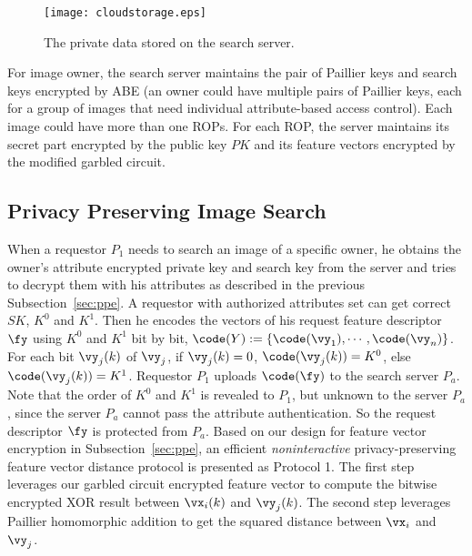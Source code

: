 {\begin{figure}[h]
\begin{center}
\texttt{[image: cloudstorage.eps]}
\caption{The private data stored on the search server.}
\label{fig:storage}
\end{center}
\end{figure}


For image owner,
 the search server maintains the pair of Paillier keys and search keys
 encrypted by ABE (an owner could have multiple pairs of Paillier
 keys, each for a group of images that need individual attribute-based
 access control).
Each image could have more than one ROPs.
For each ROP, the server maintains its secret part encrypted by the
 public key $PK$
 and its feature vectors encrypted by the modified garbled circuit.




\subsection{Privacy Preserving Image Search}
When a requestor $P_1$ needs to search an image of a specific owner,
 he obtains the owner's attribute encrypted private key and search key from the server
 and tries to decrypt them with his attributes as described in the previous Subsection~\ref{sec:ppe}.
A requestor with authorized attributes set  can get correct $SK$, $K^0$
and $K^1$.
Then he encodes the vectors of his request feature descriptor $\fy$ using $K^0$ and $K^1$ bit by bit,
 \ie $\code(Y) := \{\code(\vy_1), \cdots, \code(\vy_n)\}$.
For each bit $\vy_j(k)$ of $\vy_j$, if $\vy_j(k)=0$, $\code(\vy_j(k))=K^0$, else $\code(\vy_j(k))=K^1$.
Requestor $P_1$ uploads $\code(\fy)$ to the search server $P_a$.
Note that the order of $K^0$ and $K^1$ is revealed to $P_1$,
 but unknown to the server $P_a$, since the server $P_a$ cannot pass the attribute authentication.
So the request descriptor $\fy$ is protected from $P_a$.
Based on our design for feature vector encryption in Subsection~\ref{sec:ppe},
  an efficient \emph{noninteractive} privacy-preserving feature vector distance protocol is presented as Protocol 1.
The first step leverages our garbled circuit encrypted feature vector to compute
 the bitwise encrypted XOR result between $\vx_i(k)$ and $\vy_j(k)$.
The second step leverages Paillier homomorphic addition to get the squared distance between $\vx_i$ and $\vy_j$.





}
